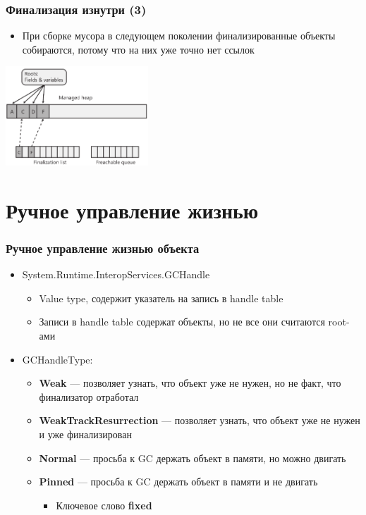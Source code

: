 \documentclass[xetex,mathserif,serif]{beamer}
\begin{document}
    \begin{frame}
        \frametitle{Финализация изнутри (3)}
        \begin{itemize}
            \item При сборке мусора в следующем поколении финализированные объекты собираются, потому что на них уже точно нет ссылок
        \end{itemize}
        \begin{center}
            \includegraphics[width=0.4\textwidth]{finalizationDone.png}
        \end{center}
    \end{frame}

    \section{Ручное управление жизнью}

    \begin{frame}
        \frametitle{Ручное управление жизнью объекта}
        \begin{itemize}
            \item System.Runtime.InteropServices.GCHandle
            \begin{itemize}
                \item Value type, содержит указатель на запись в handle table
                \item Записи в handle table содержат объекты, но не все они считаются root-ами
            \end{itemize}
            \item GCHandleType:
            \begin{itemize}
                \item \textbf{Weak} --- позволяет узнать, что объект уже не нужен, но не факт, что финализатор отработал
                \item \textbf{WeakTrackResurrection} --- позволяет узнать, что объект уже не нужен и уже финализирован
                \item \textbf{Normal} --- просьба к GC держать объект в памяти, но можно двигать
                \item \textbf{Pinned} --- просьба к GC держать объект в памяти и не двигать
                \begin{itemize}
                    \item Ключевое слово \textbf{fixed}
                \end{itemize}
            \end{itemize}
        \end{itemize}
    \end{frame}
\end{document}
